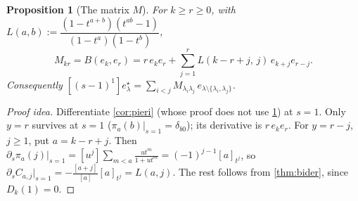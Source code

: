 \documentclass[submission]{FPSAC2027}
\newtheorem{proposition}[theorem]{Proposition}
\theoremstyle{definition}
\theoremstyle{remark}
\begin{document}
\begin{proposition}[The matrix $M$]\label{prop:M}
For $k\ge r\ge0$, with $L(a,b):=\dfrac{(1-t^{a+b})(t^{ab}-1)}{(1-t^a)(1-t^b)}$,
\[ M_{kr}=B(e_k,e_r)=r\,e_ke_r+\sum_{j=1}^{r}L(k-r+j,\,j)\,e_{k+j}e_{r-j}. \]
Consequently $[(s-1)^1]e^\star_\lambda=\sum_{i<j}M_{\lambda_i\lambda_j}\,e_{\lambda\setminus\{\lambda_i,\lambda_j\}}$.
\end{proposition}
\begin{proof}[Proof idea]
Differentiate \cref{cor:pieri} (whose proof does not use \cref{prop:M}) at $s=1$. Only $y=r$ survives at $s=1$ ($\pi_a(b)|_{s=1}=\delta_{b0}$); its derivative is $r\,e_ke_r$. For $y=r-j$, $j\ge1$, put $a=k-r+j$. Then $\partial_s\pi_a(j)|_{s=1}=[u^j]\sum_{m<a}\frac{ut^m}{1+ut^m}=(-1)^{j-1}[a]_{t^j}$, so $\partial_sC_{a,j}|_{s=1}=-\frac{[a+j]}{[a]}[a]_{t^j}=L(a,j)$. The rest follows from \cref{thm:bider}, since $D_k(1)=0$.
\end{proof}
\end{document}
